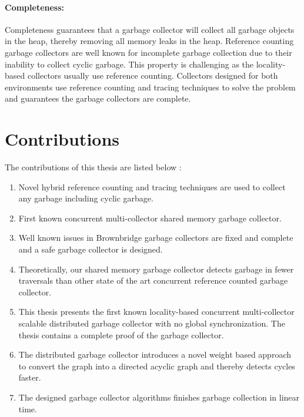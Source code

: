 \paragraph{Completeness:}
Completeness guarantees that a garbage collector will collect all garbage objects in the heap, thereby removing all memory leaks in the heap. Reference counting garbage collectors are well known for incomplete garbage collection due to their inability to collect cyclic garbage. This property is challenging as the locality-based collectors usually use reference counting. Collectors designed for both environments use reference counting and tracing techniques to solve the problem and guarantees the garbage collectors are complete.
\section{Contributions}
\label{intro:contr}
The contributions of this thesis are listed below :
\begin{enumerate}
	\item Novel hybrid reference counting and tracing techniques are used to collect any garbage including cyclic garbage.    
	\item First known concurrent multi-collector shared memory garbage collector.
	\item Well known issues in Brownbridge garbage collectors are fixed and complete and a safe garbage collector is designed.
	\item Theoretically, our shared memory garbage collector detects garbage  in fewer traversals than other state of the art concurrent reference counted garbage collector.
	\item This thesis presents the first known locality-based concurrent multi-collector scalable distributed garbage collector with no global synchronization. The thesis contains a complete proof of the garbage collector.
	\item The distributed garbage collector introduces a novel weight based approach to convert the graph into a directed acyclic graph and thereby detects cycles faster.
	\item The designed garbage collector algorithms finishes garbage collection in linear time.
\end{enumerate}
